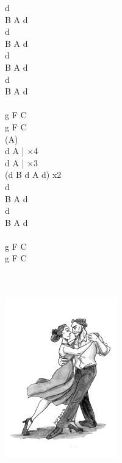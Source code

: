 \documentclass[a5paper, 10pt]{book}
\begin{document}
\begin{minipage}[t]{0.2\textwidth}
  d\\
  B A d\\
  d\\
  B A d\\
  d\\
  B A d\\
  d\\
  B A d\\
  \\
  g F C\\
  g F C\\
  (A)\\
  d A | $\times$4\\
  d A | $\times$3\\
  (d B d A d) x2\\

  d\\
  B A d\\
  d\\
  B A d\\
  \\
  g F C\\
  g F C\\
\end{minipage}
~\\
~\\
\includegraphics[height=7cm, center]{takie_tango.png}\\

\newpage
\end{document}
